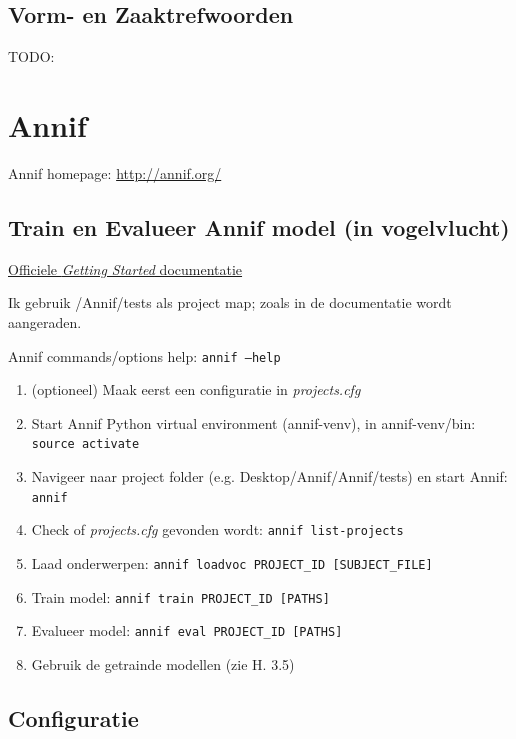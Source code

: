 \documentclass{article}
\begin{document}
\subsection{Vorm- en Zaaktrefwoorden}
TODO:

\section{Annif}

Annif homepage: \url{http://annif.org/}

\subsection{Train en Evalueer Annif model (in vogelvlucht)}

\href{https://github.com/NatLibFi/Annif/wiki/Getting-started}{Officiele \textit{Getting Started} documentatie}

Ik gebruik /Annif/tests als project map; zoals in de documentatie wordt aangeraden.

\vfill
Annif commands/options help: \texttt{annif --help}

\begin{enumerate}
  \item (optioneel) Maak eerst een configuratie in \textit{projects.cfg}
  \item Start Annif Python virtual environment (annif-venv), in annif-venv/bin: \texttt{source activate}
  \item Navigeer naar project folder (e.g. Desktop/Annif/Annif/tests) en start Annif: \texttt{annif}
  \item Check of \textit{projects.cfg} gevonden wordt: \texttt{annif list-projects}
  \item Laad onderwerpen: \verb|annif loadvoc PROJECT_ID [SUBJECT_FILE]|
  \item Train model: \verb|annif train PROJECT_ID [PATHS]|
  \item Evalueer model: \verb|annif eval PROJECT_ID [PATHS]|
  \item Gebruik de getrainde modellen (zie H. 3.5)
\end{enumerate}



\subsection{Configuratie}
\end{document}
